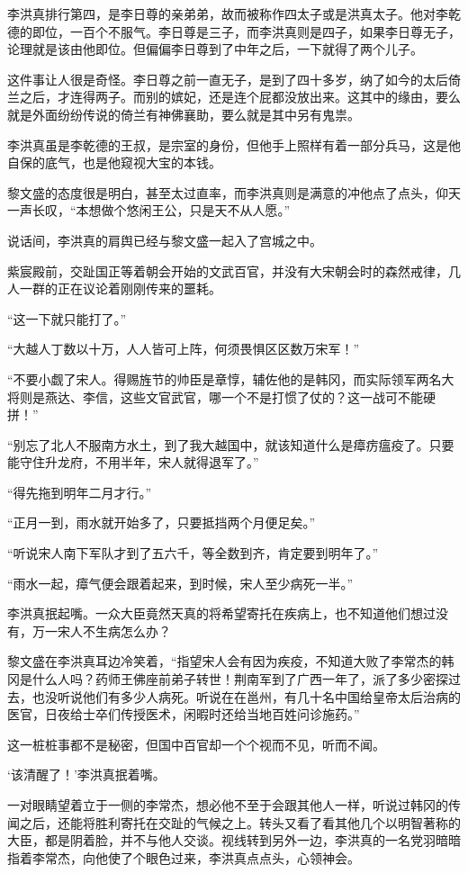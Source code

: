 李洪真排行第四，是李日尊的亲弟弟，故而被称作四太子或是洪真太子。他对李乾德的即位，一百个不服气。李日尊是三子，而李洪真则是四子，如果李日尊无子，论理就是该由他即位。但偏偏李日尊到了中年之后，一下就得了两个儿子。

这件事让人很是奇怪。李日尊之前一直无子，是到了四十多岁，纳了如今的太后倚兰之后，才连得两子。而别的嫔妃，还是连个屁都没放出来。这其中的缘由，要么就是外面纷纷传说的倚兰有神佛襄助，要么就是其中另有鬼祟。

李洪真虽是李乾德的王叔，是宗室的身份，但他手上照样有着一部分兵马，这是他自保的底气，也是他窥视大宝的本钱。

黎文盛的态度很是明白，甚至太过直率，而李洪真则是满意的冲他点了点头，仰天一声长叹，“本想做个悠闲王公，只是天不从人愿。”

说话间，李洪真的肩舆已经与黎文盛一起入了宫城之中。

紫宸殿前，交趾国正等着朝会开始的文武百官，并没有大宋朝会时的森然戒律，几人一群的正在议论着刚刚传来的噩耗。

“这一下就只能打了。”

“大越人丁数以十万，人人皆可上阵，何须畏惧区区数万宋军！”

“不要小觑了宋人。得赐旌节的帅臣是章惇，辅佐他的是韩冈，而实际领军两名大将则是燕达、李信，这些文官武官，哪一个不是打惯了仗的？这一战可不能硬拼！”

“别忘了北人不服南方水土，到了我大越国中，就该知道什么是瘴疠瘟疫了。只要能守住升龙府，不用半年，宋人就得退军了。”

“得先拖到明年二月才行。”

“正月一到，雨水就开始多了，只要抵挡两个月便足矣。”

“听说宋人南下军队才到了五六千，等全数到齐，肯定要到明年了。”

“雨水一起，瘴气便会跟着起来，到时候，宋人至少病死一半。”

李洪真抿起嘴。一众大臣竟然天真的将希望寄托在疾病上，也不知道他们想过没有，万一宋人不生病怎么办？

黎文盛在李洪真耳边冷笑着，“指望宋人会有因为疾疫，不知道大败了李常杰的韩冈是什么人吗？药师王佛座前弟子转世！荆南军到了广西一年了，派了多少密探过去，也没听说他们有多少人病死。听说在在邕州，有几十名中国给皇帝太后治病的医官，日夜给士卒们传授医术，闲暇时还给当地百姓问诊施药。”

这一桩桩事都不是秘密，但国中百官却一个个视而不见，听而不闻。

‘该清醒了！’李洪真抿着嘴。

一对眼睛望着立于一侧的李常杰，想必他不至于会跟其他人一样，听说过韩冈的传闻之后，还能将胜利寄托在交趾的气候之上。转头又看了看其他几个以明智著称的大臣，都是阴着脸，并不与他人交谈。视线转到另外一边，李洪真的一名党羽暗暗指着李常杰，向他使了个眼色过来，李洪真点点头，心领神会。

